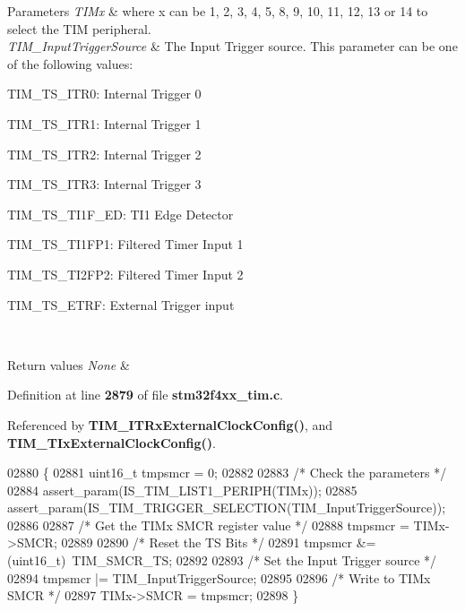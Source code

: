 \begin{DoxyParams}{Parameters}
{\em T\+I\+Mx} & where x can be 1, 2, 3, 4, 5, 8, 9, 10, 11, 12, 13 or 14 to select the T\+IM peripheral. \\
\hline
{\em T\+I\+M\+\_\+\+Input\+Trigger\+Source} & The Input Trigger source. This parameter can be one of the following values\+: \begin{DoxyItemize}
\item T\+I\+M\+\_\+\+T\+S\+\_\+\+I\+T\+R0\+: Internal Trigger 0 \item T\+I\+M\+\_\+\+T\+S\+\_\+\+I\+T\+R1\+: Internal Trigger 1 \item T\+I\+M\+\_\+\+T\+S\+\_\+\+I\+T\+R2\+: Internal Trigger 2 \item T\+I\+M\+\_\+\+T\+S\+\_\+\+I\+T\+R3\+: Internal Trigger 3 \item T\+I\+M\+\_\+\+T\+S\+\_\+\+T\+I1\+F\+\_\+\+ED\+: T\+I1 Edge Detector \item T\+I\+M\+\_\+\+T\+S\+\_\+\+T\+I1\+F\+P1\+: Filtered Timer Input 1 \item T\+I\+M\+\_\+\+T\+S\+\_\+\+T\+I2\+F\+P2\+: Filtered Timer Input 2 \item T\+I\+M\+\_\+\+T\+S\+\_\+\+E\+T\+RF\+: External Trigger input \end{DoxyItemize}
\\
\hline
\end{DoxyParams}

\begin{DoxyRetVals}{Return values}
{\em None} & \\
\hline
\end{DoxyRetVals}


Definition at line \textbf{ 2879} of file \textbf{ stm32f4xx\+\_\+tim.\+c}.



Referenced by \textbf{ T\+I\+M\+\_\+\+I\+T\+Rx\+External\+Clock\+Config()}, and \textbf{ T\+I\+M\+\_\+\+T\+Ix\+External\+Clock\+Config()}.


\begin{DoxyCode}
02880 \{
02881   uint16\_t tmpsmcr = 0;
02882 
02883   \textcolor{comment}{/* Check the parameters */}
02884   assert_param(IS_TIM_LIST1_PERIPH(TIMx)); 
02885   assert_param(IS_TIM_TRIGGER_SELECTION(TIM\_InputTriggerSource));
02886 
02887   \textcolor{comment}{/* Get the TIMx SMCR register value */}
02888   tmpsmcr = TIMx->SMCR;
02889 
02890   \textcolor{comment}{/* Reset the TS Bits */}
02891   tmpsmcr &= (uint16\_t)~TIM_SMCR_TS;
02892 
02893   \textcolor{comment}{/* Set the Input Trigger source */}
02894   tmpsmcr |= TIM\_InputTriggerSource;
02895 
02896   \textcolor{comment}{/* Write to TIMx SMCR */}
02897   TIMx->SMCR = tmpsmcr;
02898 \}
\end{DoxyCode}
\mbox{\label{group__TIM__Group7_ga4dcc3d11b670c381d0ff9cb7e9fd01e2}} 
